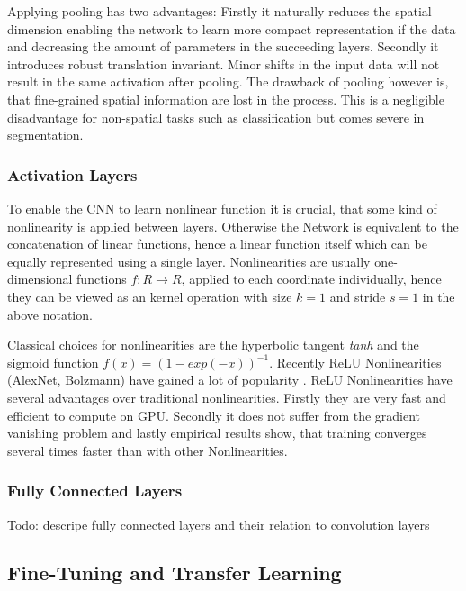 Applying pooling has two  advantages: Firstly it naturally reduces the spatial dimension enabling the network to learn more compact representation if the data and decreasing the amount of parameters in the succeeding layers. Secondly it introduces robust translation invariant. Minor shifts in the input data will not result in the same activation after pooling. The drawback of pooling however is, that fine-grained spatial information are lost in the process. This is a negligible disadvantage for non-spatial tasks such as classification but comes severe in segmentation. 

 \subsubsection{Activation Layers}
 
 To enable the CNN to learn nonlinear function it is crucial, that some kind of nonlinearity is applied between layers. Otherwise the Network is equivalent to the concatenation of linear functions, hence a linear function itself which can be equally represented using a single layer. Nonlinearities are usually one-dimensional functions $f: R \rightarrow R$, applied to each coordinate individually, hence they can be viewed as an kernel operation with size $k=1$ and stride $s=1$ in the above notation. 
 
Classical choices for nonlinearities are the hyperbolic tangent \emph{tanh} and the sigmoid function $f(x) = (1- exp(-x))^{-1}$. Recently ReLU Nonlinearities \cite{AlexNet}(AlexNet, Bolzmann) have gained a lot of popularity \cite{AlexNet,VGG16,googLeNeT}. ReLU Nonlinearities have several advantages over traditional nonlinearities. Firstly they are very fast and efficient to compute on GPU. Secondly it does not suffer from the gradient vanishing problem and lastly empirical results show, that training converges several times faster than with other Nonlinearities.

\subsubsection{Fully Connected Layers}

Todo: descripe fully connected layers and their relation to convolution layers

\subsection{Fine-Tuning and Transfer Learning}

